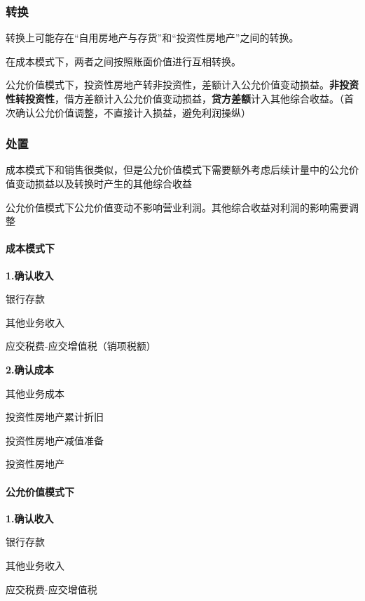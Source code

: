 \documentclass[UTF8,12pt]{ctexart}
\newenvironment{Dr}{%
	\begin{list}{}%
		{
			\setlength{\leftmargin}{2em}
			\setlength{\labelwidth}{2em}
			\setlength{\labelsep}{0pt}
			\setlength{\itemindent}{0pt}
			\setlength{\listparindent}{0pt}
			\setlength{\parsep}{0pt}
			\setlength{\topsep}{0pt}
		}
		\item[\textbf{借：}]
	}{%
	\end{list}
}
\newenvironment{Cr}{%
	\begin{list}{}%
		{
			\setlength{\leftmargin}{2em}
			\setlength{\labelwidth}{2em}
			\setlength{\labelsep}{0pt}
			\setlength{\itemindent}{0pt}
			\setlength{\listparindent}{0pt}
			\setlength{\parsep}{0pt}
			\setlength{\topsep}{0pt}
		}
		\item[\textbf{贷：}]
	}{%
	\end{list}
}
\numberwithin{equation}{section} %
\numberwithin{figure}{section}
\numberwithin{table}{section}
\begin{document}
	\subsubsection{转换}
	转换上可能存在“自用房地产与存货”和“投资性房地产”之间的转换。
	
	在成本模式下，两者之间按照账面价值进行互相转换。
	
	公允价值模式下，投资性房地产转非投资性，差额计入公允价值变动损益。\textbf{非投资性转投资性}，借方差额计入公允价值变动损益，\textbf{贷方差额}计入其他综合收益。（首次确认公允价值调整，不直接计入损益，避免利润操纵）
	
	\subsubsection{处置}
	成本模式下和销售很类似，但是公允价值模式下需要额外考虑后续计量中的公允价值变动损益以及转换时产生的其他综合收益
	
	公允价值模式下公允价值变动不影响营业利润。其他综合收益对利润的影响需要调整
	
	
	\paragraph{成本模式下}
	
	\textbf{1.确认收入}
	
	\begin{Dr}
		银行存款
	\end{Dr}
	\begin{Cr}
		其他业务收入
		
		应交税费-应交增值税（销项税额）
	\end{Cr}

	
	\textbf{2.确认成本}
	
	\begin{Dr}
		其他业务成本
		
		投资性房地产累计折旧
		
		投资性房地产减值准备
	\end{Dr}
	\begin{Cr}
		投资性房地产
	\end{Cr}

	
	\paragraph{公允价值模式下}
	\textbf{1.确认收入}
	
	\begin{Dr}
		银行存款
	\end{Dr}
	\begin{Cr}
		其他业务收入
		
		应交税费-应交增值税
	\end{Cr}
	
\end{document}
